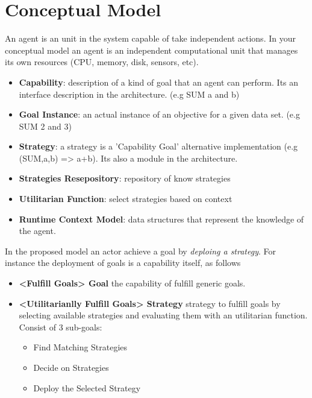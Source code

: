 \section{Conceptual Model}
\label{conceptual_model}

An agent is an unit in the system capable of take independent actions. In your conceptual model an agent is an independent computational unit that manages its own resources (CPU, memory, disk, sensors, etc).


\begin{itemize}
  \item \textbf{Capability}: description of a kind of goal that an agent can perform.   Its an interface description in the architecture. (e.g SUM a and b)
  \item \textbf{Goal Instance}: an actual instance of an objective for a given data set. (e.g SUM 2 and 3)
  \item \textbf{Strategy}: a strategy is a 'Capability Goal' alternative implementation (e.g (SUM,a,b) => {a+b}). Its also a module in the architecture.
  \item \textbf{Strategies Resepository}: repository of know strategies
  \item \textbf{Utilitarian Function}: select strategies based on context
  \item \textbf{Runtime Context Model}: data structures that represent the knowledge of the agent.
\end{itemize}

In the proposed model an actor achieve a goal by \emph{deploing a strategy}. For instance the deployment of goals is a capability itself, as follows

\begin{itemize}
\item \textbf{<Fulfill Goals> Goal} the capability of fulfill generic goals.

\item \textbf{<Utilitarianlly Fulfill Goals> Strategy } strategy to fulfill goals by selecting available strategies and evaluating them with an utilitarian function. Consist of 3 sub-goals:
  \begin{itemize}
    \item Find Matching Strategies
    \item Decide on Strategies
    \item Deploy the Selected Strategy
  \end{itemize}
\end{itemize}

